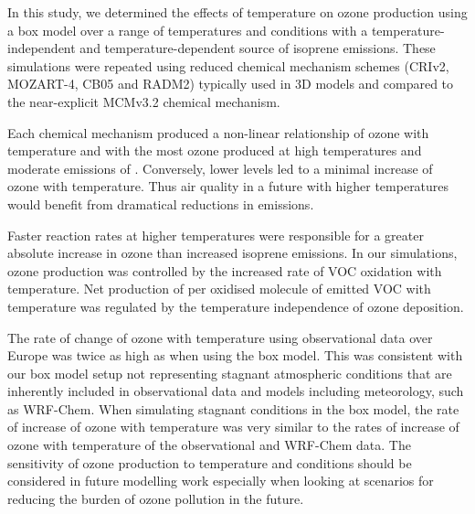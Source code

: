 In this study, we determined the effects of temperature on ozone production using a box model over a range of temperatures and  conditions with a temperature-independent and temperature-dependent source of isoprene emissions.
These simulations were repeated using reduced chemical mechanism schemes (CRIv2, MOZART-4, CB05 and RADM2) typically used in 3D models and compared to the near-explicit MCMv3.2 chemical mechanism.

Each chemical mechanism produced a non-linear relationship of ozone with temperature and  with the most ozone produced at high temperatures and moderate emissions of .
Conversely, lower  levels led to a minimal increase of ozone with temperature.
Thus air quality in a future with higher temperatures would benefit from dramatical reductions in  emissions.

Faster reaction rates at higher temperatures were responsible for a greater absolute increase in ozone than increased isoprene emissions.
In our simulations, ozone production was controlled by the increased rate of VOC oxidation with temperature.
Net production of  per oxidised molecule of emitted VOC with temperature was regulated by the temperature independence of ozone deposition.

The rate of change of ozone with temperature using observational data over Europe was twice as high as when using the box model.
This was consistent with our box model setup not representing stagnant atmospheric conditions that are inherently included in observational data and models including meteorology, such as WRF-Chem.
When simulating stagnant conditions in the box model, the rate of increase of ozone with temperature was very similar to the rates of increase of ozone with temperature of the observational and WRF-Chem data.
The sensitivity of ozone production to temperature and  conditions should be considered in future modelling work especially when looking at scenarios for reducing the burden of ozone pollution in the future.
